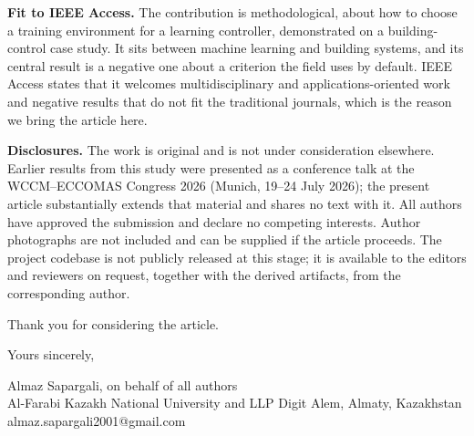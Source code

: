 \documentclass[11pt,a4paper]{article}
\begin{document}
\textbf{Fit to IEEE Access.} The contribution is methodological, about how to
choose a training environment for a learning controller, demonstrated on a
building-control case study. It sits between machine learning and building
systems, and its central result is a negative one about a criterion the field
uses by default. IEEE Access states that it welcomes multidisciplinary and
applications-oriented work and negative results that do not fit the traditional
journals, which is the reason we bring the article here.

\textbf{Disclosures.} The work is original and is not under consideration
elsewhere. Earlier results from this study were presented as a conference talk at
the WCCM--ECCOMAS Congress 2026 (Munich, 19--24 July 2026); the present article
substantially extends that material and shares no text with it. All authors have
approved the submission and declare no competing interests. Author photographs
are not included and can be supplied if the article proceeds. The project
codebase is not publicly released at this stage; it
is available to the editors and reviewers on request, together with the derived
artifacts, from the corresponding author.

Thank you for considering the article.

\vspace{10pt}
Yours sincerely,

\vspace{6pt}
Almaz Sapargali, on behalf of all authors\\
Al-Farabi Kazakh National University and LLP Digit Alem, Almaty, Kazakhstan\\
almaz.sapargali2001@gmail.com
\end{document}
